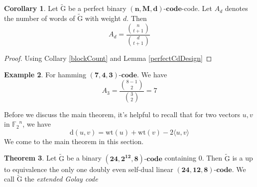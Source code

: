 \documentclass[12pt]{article}
\theoremstyle{definition}
\newtheorem{theorem}{Theorem}[section]
\newtheorem{example}[theorem]{Example}
\newtheorem{collary}[theorem]{Corollary}
\numberwithin{equation}{theorem}
\numberwithin{figure}{theorem}
\newcommand{\cCodes}{\ensuremath{\widetilde{\mathrm{G}}}}
\newcommand{\code}[3]{\ensuremath{\bm{(#1,#2,#3)\mbox{-}code}}}
\newcommand{\linearCode}[3]{\ensuremath{\bm{(#1,#2,#3)\mbox{-}code}}}
\newcommand{\ftwoN}[1]{\ensuremath{\mathbb{F}_2}^{#1}}
\newcommand{\wt}[1]{\ensuremath{\text{wt}(#1)}}
\newcommand{\dist}[2]{\ensuremath{\text{d}(#1,#2)}}
\begin{document}
\begin{collary}\label{perfectCodeAd}
Let {\cCodes} be a perfect binary \code{n}{M}{d}-code. Let $A_d$ denotes the number of words of {\cCodes} with weight $d$. Then
\[
	A_d = \frac{\binom{n}{t+1}}{\binom{d}{t+1}}
\]
\end{collary}
\begin{proof}
	Using Collary \ref{blockCount}  and Lemma \ref{perfectCdDesign}
\end{proof}
\begin{example}
For hamming \linearCode{7}{4}{3}. We have
\[
	A_3 = \frac{\binom{8-1}{2}}{\binom{3}{2}} = 7
\]
\end{example}
Before we discuss the main theorem, it's helpful to recall that for two vectors $u,v$ in $\ftwoN{n}$, we have
\begin{equation}\label{distWeightEqn}
	\dist{u}{v} = \wt{u} + \wt{v} - 2\langle u, v\rangle 
\end{equation}
We come to the main theorem in this section.
\begin{theorem}
Let {\cCodes} be a binary {\code{24}{2^{12}}{8}} containing 0. Then {\cCodes} is a up to equivalence the only one doubly even self-dual linear {\linearCode{24}{12}{8}}. We call {\cCodes} the \emph{extended Golay code}
\end{theorem}
\end{document}
